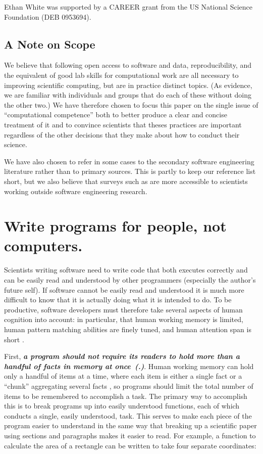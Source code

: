 \documentclass{article}
\newcommand{\practicesection}[2]{\section{#1}\label{#2}}
\newcounter{PracticeIdentifier}[section]
\newcommand{\practice}[1]{\stepcounter{PracticeIdentifier}\textbf{\emph{{#1}~(\arabic{section}.\arabic{PracticeIdentifier})}}}
\begin{document}
Ethan White was supported by a CAREER grant from the US National
Science Foundation (DEB 0953694).

\subsection*{A Note on Scope}

We believe that following open access to software and data,
reproducibility, and the equivalent of good lab skills for
computational work are all necessary to improving scientific
computing, but are in practice distinct topics.  (As evidence, we are
familiar with individuals and groups that do each of these without
doing the other two.)  We have therefore chosen to focus this paper on
the single issue of ``computational competence'' both to better
produce a clear and concise treatment of it and to convince scientists
that theses practices are important regardless of the other decisions
that they make about how to conduct their science.

We have also chosen to refer in some cases to the secondary software
engineering literature rather than to primary sources.  This is partly
to keep our reference list short, but we also believe that surveys
such as \cite{oram2010} are more accessible to scientists working
outside software engineering research.

\practicesection{Write programs for people, not computers.}{cognition}

Scientists writing software need to write code that both executes
correctly and can be easily read and understood by other
programmers (especially the author's future self).
If software cannot be easily read and understood it is
much more difficult to know that it is actually doing what it is intended
to do.
To be productive,
software developers must therefore take several aspects of human cognition into account:
in particular,
that human working memory is limited, human pattern
matching abilities are finely tuned, and human attention span is short
\cite{baddeley2009,hock2008, letovsky1986,binkley2009,robinson2005}.

First, \practice{a program should not require its readers to hold
  more than a handful of facts in memory at once}.  Human working
memory can hold only a handful of items at a time, where each item is
either a single fact or a ``chunk'' aggregating several facts
\cite{baddeley2009,hock2008}, so programs should limit
the total number of items to be remembered to accomplish a task.
The primary way to accomplish this is to break programs up
into easily understood functions, each of which conducts a single,
easily understood, task. This serves to make each piece of the
program easier to understand in the same way that breaking up a scientific
paper using sections and paragraphs makes it easier to read. For
example, a function to calculate the area of a rectangle can be
written to take four separate coordinates:
\end{document}
